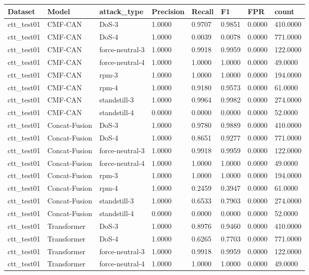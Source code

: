 \begin{tabular}{llllllll}
\toprule
Dataset & Model & attack_type & Precision & Recall & F1 & FPR & count \\
\midrule
ctt_test01 & CMF-CAN & DoS-3 & 1.0000 & 0.9707 & 0.9851 & 0.0000 & 410.0000 \\
ctt_test01 & CMF-CAN & DoS-4 & 1.0000 & 0.0039 & 0.0078 & 0.0000 & 771.0000 \\
ctt_test01 & CMF-CAN & force-neutral-3 & 1.0000 & 0.9918 & 0.9959 & 0.0000 & 122.0000 \\
ctt_test01 & CMF-CAN & force-neutral-4 & 1.0000 & 1.0000 & 1.0000 & 0.0000 & 49.0000 \\
ctt_test01 & CMF-CAN & rpm-3 & 1.0000 & 1.0000 & 1.0000 & 0.0000 & 194.0000 \\
ctt_test01 & CMF-CAN & rpm-4 & 1.0000 & 0.9180 & 0.9573 & 0.0000 & 61.0000 \\
ctt_test01 & CMF-CAN & standstill-3 & 1.0000 & 0.9964 & 0.9982 & 0.0000 & 274.0000 \\
ctt_test01 & CMF-CAN & standstill-4 & 0.0000 & 0.0000 & 0.0000 & 0.0000 & 52.0000 \\
ctt_test01 & Concat-Fusion & DoS-3 & 1.0000 & 0.9780 & 0.9889 & 0.0000 & 410.0000 \\
ctt_test01 & Concat-Fusion & DoS-4 & 1.0000 & 0.8651 & 0.9277 & 0.0000 & 771.0000 \\
ctt_test01 & Concat-Fusion & force-neutral-3 & 1.0000 & 0.9918 & 0.9959 & 0.0000 & 122.0000 \\
ctt_test01 & Concat-Fusion & force-neutral-4 & 1.0000 & 1.0000 & 1.0000 & 0.0000 & 49.0000 \\
ctt_test01 & Concat-Fusion & rpm-3 & 1.0000 & 1.0000 & 1.0000 & 0.0000 & 194.0000 \\
ctt_test01 & Concat-Fusion & rpm-4 & 1.0000 & 0.2459 & 0.3947 & 0.0000 & 61.0000 \\
ctt_test01 & Concat-Fusion & standstill-3 & 1.0000 & 0.6533 & 0.7903 & 0.0000 & 274.0000 \\
ctt_test01 & Concat-Fusion & standstill-4 & 0.0000 & 0.0000 & 0.0000 & 0.0000 & 52.0000 \\
ctt_test01 & Transformer & DoS-3 & 1.0000 & 0.8976 & 0.9460 & 0.0000 & 410.0000 \\
ctt_test01 & Transformer & DoS-4 & 1.0000 & 0.6265 & 0.7703 & 0.0000 & 771.0000 \\
ctt_test01 & Transformer & force-neutral-3 & 1.0000 & 0.9918 & 0.9959 & 0.0000 & 122.0000 \\
ctt_test01 & Transformer & force-neutral-4 & 1.0000 & 1.0000 & 1.0000 & 0.0000 & 49.0000 \\

\end{tabular}
